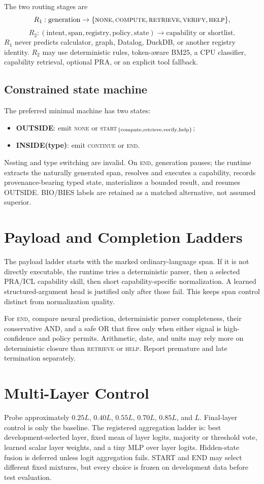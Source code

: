 \documentclass[10pt]{article}
\begin{document}
The two routing stages are
\[
R_1:\text{generation}\rightarrow
\{\textsc{none},\textsc{compute},\textsc{retrieve},\textsc{verify},\textsc{help}\},
\]
\[
R_2:(\text{intent},\text{span},\text{registry},\text{policy},\text{state})
\rightarrow\text{capability or shortlist}.
\]
$R_1$ never predicts calculator, graph, Datalog, DuckDB, or another registry
identity. $R_2$ may use deterministic rules, token-aware BM25, a CPU classifier,
capability retrieval, optional PRA, or an explicit tool fallback.

\subsection{Constrained state machine}
The preferred minimal machine has two states:
\begin{itemize}
\item \textbf{OUTSIDE}: emit \textsc{none} or
\textsc{start}$_{\{\rm compute,retrieve,verify,help\}}$;
\item \textbf{INSIDE(type)}: emit \textsc{continue} or \textsc{end}.
\end{itemize}
Nesting and type switching are invalid. On \textsc{end}, generation pauses;
the runtime extracts the naturally generated span, resolves and executes a
capability, records provenance-bearing typed state, materializes a bounded
result, and resumes OUTSIDE. BIO/BIES labels are retained as a matched
alternative, not assumed superior.

\section{Payload and Completion Ladders}
The payload ladder starts with the marked ordinary-language span. If it is not
directly executable, the runtime tries a deterministic parser, then a selected
PRA/ICL capability skill, then short capability-specific normalization. A
learned structured-argument head is justified only after those fail. This keeps
span control distinct from normalization quality.

For \textsc{end}, compare neural prediction, deterministic parser completeness,
their conservative AND, and a safe OR that fires only when either signal is
high-confidence and policy permits. Arithmetic, date, and units may rely more
on deterministic closure than \textsc{retrieve} or \textsc{help}. Report
premature and late termination separately.

\section{Multi-Layer Control}
Probe approximately $0.25L$, $0.40L$, $0.55L$, $0.70L$, $0.85L$, and $L$.
Final-layer control is only the baseline. The registered aggregation ladder is:
best development-selected layer, fixed mean of layer logits, majority or
threshold vote, learned scalar layer weights, and a tiny MLP over layer logits.
Hidden-state fusion is deferred unless logit aggregation fails. START and END
may select different fixed mixtures, but every choice is frozen on development
data before test evaluation.
\end{document}

